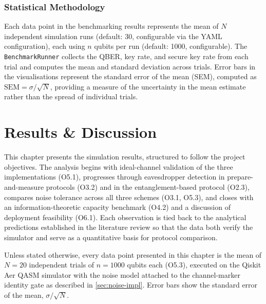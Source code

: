 \documentclass[10pt, a4paper]{report}
\begin{document}
\subsection{Statistical Methodology}

Each data point in the benchmarking results represents the mean of $N$ independent simulation runs (default: 30, configurable via the YAML configuration), each using $n$ qubits per run (default: 1000, configurable). The \texttt{BenchmarkRunner} collects the QBER, key rate, and secure key rate from each trial and computes the mean and standard deviation across trials. Error bars in the visualisations represent the standard error of the mean (SEM), computed as $\text{SEM} = \sigma / \sqrt{N}$, providing a measure of the uncertainty in the mean estimate rather than the spread of individual trials.



\chapter{Results \& Discussion}

This chapter presents the simulation results, structured to follow the project objectives. The analysis begins with ideal-channel validation of the three implementations (O5.1), progresses through eavesdropper detection in prepare-and-measure protocols (O3.2) and in the entanglement-based protocol (O2.3), compares noise tolerance across all three schemes (O3.1, O5.3), and closes with an information-theoretic capacity benchmark (O4.2) and a discussion of deployment feasibility (O6.1). Each observation is tied back to the analytical predictions established in the literature review so that the data both verify the simulator and serve as a quantitative basis for protocol comparison.

Unless stated otherwise, every data point presented in this chapter is the mean of $N = 20$ independent trials of $n = 1000$ qubits each (O5.3), executed on the Qiskit Aer QASM simulator with the noise model attached to the channel-marker identity gate as described in \cref{sec:noise-impl}. Error bars show the standard error of the mean, $\sigma/\sqrt{N}$.
\end{document}
